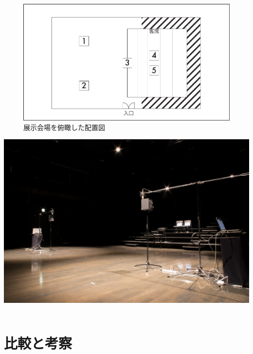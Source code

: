 \documentclass[a4paper,report]{jsbook}
\begin{document}
\begin{figure}[htbp]
\centering
\includegraphics[width=1.00000\textwidth]{./img/place.pdf}
\caption{展示会場を俯瞰した配置図\label{fig:fukan}}
\end{figure}

\includegraphics[width=1.00000\textwidth]{./img/postpast1.jpg}~

\section{比較と考察}\label{ux6bd4ux8f03ux3068ux8003ux5bdf}
\end{document}

